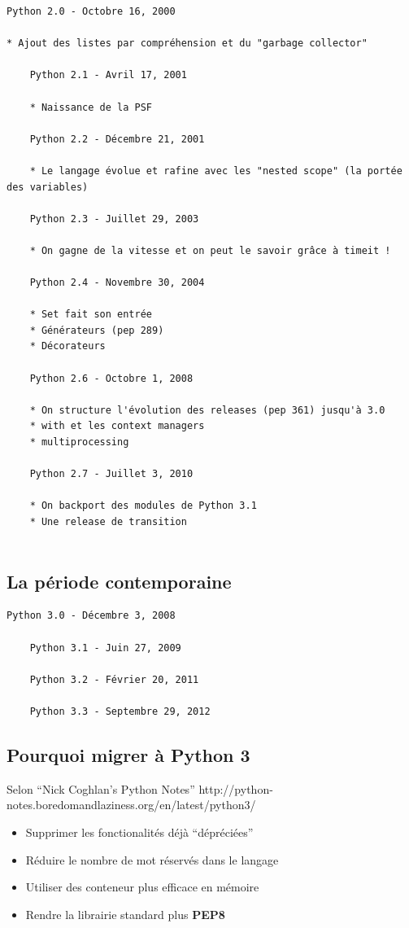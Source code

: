 \documentclass[letterpaper,10pt,english]{/Users/mlhamel/venv/apius/lib/python2.7/site-packages/sphinx/texinputs/sphinxhowto}
\begin{document}
\begin{verbatim}
Python 2.0 - Octobre 16, 2000

* Ajout des listes par compréhension et du "garbage collector" 

    Python 2.1 - Avril 17, 2001
    
    * Naissance de la PSF
    
    Python 2.2 - Décembre 21, 2001
    
    * Le langage évolue et rafine avec les "nested scope" (la portée des variables)
    
    Python 2.3 - Juillet 29, 2003
    
    * On gagne de la vitesse et on peut le savoir grâce à timeit !
    
    Python 2.4 - Novembre 30, 2004
    
    * Set fait son entrée 
    * Générateurs (pep 289)
    * Décorateurs
    
    Python 2.6 - Octobre 1, 2008
    
    * On structure l'évolution des releases (pep 361) jusqu'à 3.0
    * with et les context managers
    * multiprocessing
    
    Python 2.7 - Juillet 3, 2010
    
    * On backport des modules de Python 3.1
    * Une release de transition
    
\end{verbatim}\subsection{La période contemporaine}\label{la-période-contemporaine}

\begin{verbatim}
Python 3.0 - Décembre 3, 2008

    Python 3.1 - Juin 27, 2009
    
    Python 3.2 - Février 20, 2011
    
    Python 3.3 - Septembre 29, 2012
\end{verbatim}\subsection{Pourquoi migrer à Python
3}\label{pourquoi-migrer-à-python-3}

Selon ``Nick Coghlan's Python Notes''
http://python-notes.boredomandlaziness.org/en/latest/python3/

\begin{itemize}
\itemsep1pt\parskip0pt
\item
  Supprimer les fonctionalités déjà ``dépréciées''
\item
  Réduire le nombre de mot réservés dans le langage
\item
  Utiliser des conteneur plus efficace en mémoire
\item
  Rendre la librairie standard plus \textbf{PEP8}
\end{itemize}
\end{document}
